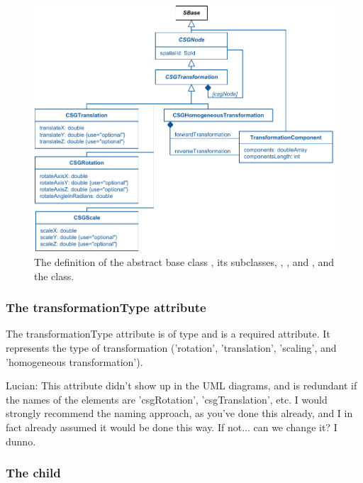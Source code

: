 \begin{figure}[ht]
  \includegraphics{figs/CSGTransformation-uml}
  \caption{The definition of the abstract base class \CSGTransformation, its subclasses, \CSGRotation, \CSGScale, and \CSGHomogeneousTransformation, and the \TransformationComponent class.}
  \label{CSGTransformation-uml}
  \label{CSGRotation-uml}
  \label{CSGScale-uml}
  \label{CSGHomogeneousTransformation-uml}
  \label{TransformationComponent-uml}
\end{figure}

\subsubsection{The transformationType attribute}
The transformationType attribute is of type  and is a required attribute. It represents the type of transformation ('rotation', 'translation', 'scaling', and 'homogeneous transformation').

{\color{red} Lucian: \notice This attribute didn't show up in the UML diagrams, and is redundant if the names of the elements are 'csgRotation', 'csgTranslation', etc.  I would strongly recommend the naming approach, as you've done this already, and I in fact already assumed it would be done this way.  If not... can we change it?  I dunno.}

\subsubsection{The  child}

